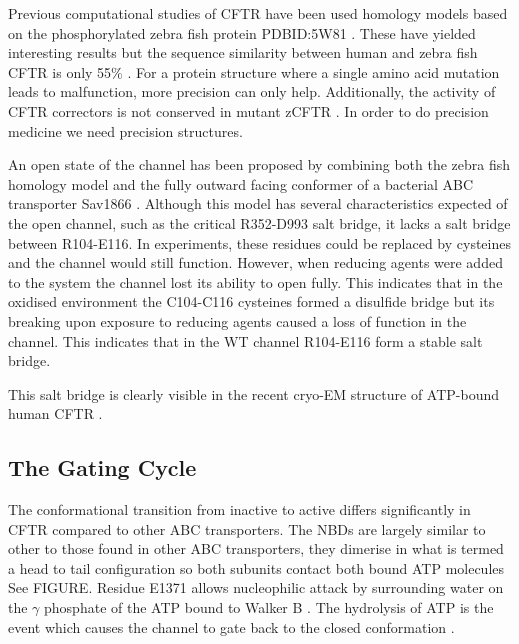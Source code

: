 Previous computational studies of CFTR have been used homology models based on the phosphorylated zebra fish protein PDBID:5W81 \cite{zhang2017a}. These have yielded interesting results but the sequence similarity between human and zebra fish CFTR is only 55\% \cite{}. For a protein structure where a single amino acid mutation leads to malfunction, more precision can only help. Additionally, the activity of CFTR correctors is not conserved in mutant zCFTR \cite{laselva2019}. In order to do precision medicine we need precision structures. 

An open state of the channel has been proposed by combining both the zebra fish homology model and the fully outward facing conformer of a bacterial ABC transporter Sav1866 \cite{Hoffmann2018}. Although this model has several characteristics expected of the open channel, such as the critical R352-D993 salt bridge, it lacks a salt bridge between R104-E116. In experiments, these residues could be replaced by cysteines and the channel would still function. However, when reducing agents were added to the system the channel lost its ability to open fully. This indicates that in the oxidised environment the C104-C116 cysteines formed a disulfide bridge but its breaking upon exposure to reducing agents caused a loss of function in the channel. This indicates that in the WT channel R104-E116 form a stable salt bridge. 

This salt bridge is clearly visible in the recent cryo-EM structure of ATP-bound human CFTR \cite{zhang2018}.

\subsection{The Gating Cycle}
The conformational transition from inactive to active differs significantly in CFTR compared to other ABC transporters. The NBDs are largely similar to other to those found in other ABC transporters, they dimerise in what is termed a head to tail configuration so both subunits contact both bound ATP molecules \cite{} See FIGURE. Residue E1371 allows nucleophilic attack by surrounding water on the $\gamma$ phosphate  of the ATP bound to Walker B \cite{Stratford2007}. The hydrolysis of ATP is the event which causes the channel to gate back to the closed conformation \cite{}. 

